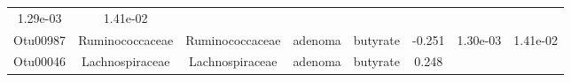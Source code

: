 \documentclass[11pt,]{article}
\begin{document}
\begin{longtable}[]{@{}cccccccc@{}}
\begin{minipage}[t]{0.08\columnwidth}
1.29e-03\strut
\end{minipage} & \begin{minipage}[t]{0.08\columnwidth}\centering\strut
1.41e-02\strut
\end{minipage}\tabularnewline
\begin{minipage}[t]{0.08\columnwidth}\centering\strut
Otu00987\strut
\end{minipage} & \begin{minipage}[t]{0.15\columnwidth}\centering\strut
Ruminococcaceae\strut
\end{minipage} & \begin{minipage}[t]{0.15\columnwidth}\centering\strut
Ruminococcaceae\strut
\end{minipage} & \begin{minipage}[t]{0.08\columnwidth}\centering\strut
adenoma\strut
\end{minipage} & \begin{minipage}[t]{0.09\columnwidth}\centering\strut
butyrate\strut
\end{minipage} & \begin{minipage}[t]{0.07\columnwidth}\centering\strut
-0.251\strut
\end{minipage} & \begin{minipage}[t]{0.08\columnwidth}\centering\strut
1.30e-03\strut
\end{minipage} & \begin{minipage}[t]{0.08\columnwidth}\centering\strut
1.41e-02\strut
\end{minipage}\tabularnewline
\begin{minipage}[t]{0.08\columnwidth}\centering\strut
Otu00046\strut
\end{minipage} & \begin{minipage}[t]{0.15\columnwidth}\centering\strut
Lachnospiraceae\strut
\end{minipage} & \begin{minipage}[t]{0.15\columnwidth}\centering\strut
Lachnospiraceae\strut
\end{minipage} & \begin{minipage}[t]{0.08\columnwidth}\centering\strut
adenoma\strut
\end{minipage} & \begin{minipage}[t]{0.09\columnwidth}\centering\strut
butyrate\strut
\end{minipage} & \begin{minipage}[t]{0.07\columnwidth}\centering\strut
0.248\strut
\end{minipage} & \begin{minipage}[t]{0.08\columnwidth}\centering\strut

\end{minipage}
\end{longtable}
\end{document}
